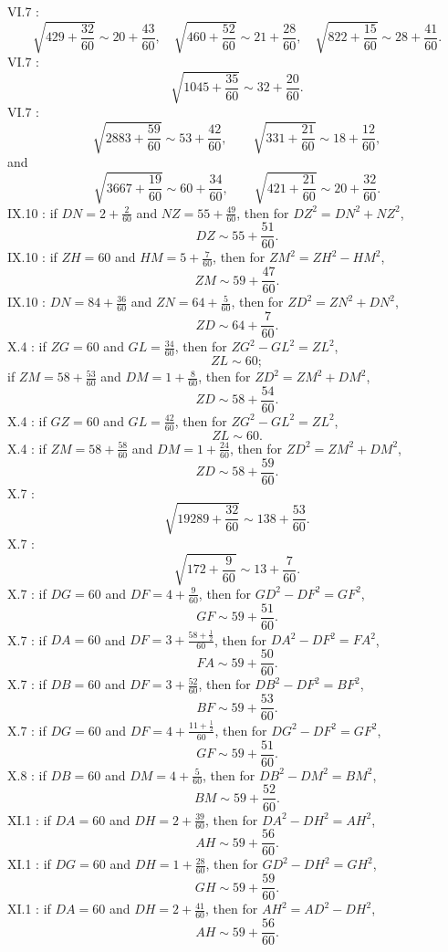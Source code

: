 \documentclass{article}
\theoremstyle{definition}
\begin{document}
VI.7 \cite[p.~299]{almagest}:
\[
\sqrt{429+\frac{32}{60}} \sim 20+\frac{43}{60},\quad
\sqrt{460+\frac{52}{60}} \sim 21+\frac{28}{60},
\quad 
\sqrt{822+\frac{15}{60}} \sim 28+\frac{41}{60}.
\]
VI.7 \cite[p.~300]{almagest}:
\[
\sqrt{1045+\frac{35}{60}} \sim 32+\frac{20}{60}.
\]
VI.7 \cite[p.~301]{almagest}:
\[
\sqrt{2883+\frac{59}{60}} \sim 53+\frac{42}{60},
\qquad \sqrt{331+\frac{21}{60}} \sim 18+\frac{12}{60},
\]
and
\[
\sqrt{3667+\frac{19}{60}} \sim 60+\frac{34}{60},
\qquad \sqrt{421+\frac{21}{60}} \sim 20+\frac{32}{60}.
\]
IX.10 \cite[p.~463]{almagest}: if $DN=2+\frac{2}{60}$ and $NZ=55+\frac{49}{60}$, then for
$DZ^2=DN^2+NZ^2$,
\[
DZ \sim 55 + \frac{51}{60}.
\]
IX.10 \cite[pp.~465--466]{almagest}: if $ZH=60$ and $HM=5+\frac{7}{60}$, then for $ZM^2=ZH^2-HM^2$,
\[
ZM \sim 59+\frac{47}{60}.
\]
IX.10 \cite[p.~466]{almagest}: $DN=84+\frac{36}{60}$ and $ZN=64+\frac{5}{60}$, then for $ZD^2=ZN^2+DN^2$,
\[
ZD \sim 64+\frac{7}{60}.
\]
X.4 \cite[p.~476]{almagest}: if $ZG=60$ and $GL=\frac{34}{60}$, then for $ZG^2-GL^2=ZL^2$,
\[
ZL \sim 60;
\]
if $ZM=58+\frac{53}{60}$ and $DM=1+\frac{8}{60}$, then for $ZD^2=ZM^2+DM^2$,
\[
ZD \sim 58 + \frac{54}{60}.
\]
X.4 \cite[pp.~477--478]{almagest}: if $GZ=60$ and $GL=\frac{42}{60}$, then for $ZG^2-GL^2=ZL^2$,
\[
ZL \sim 60.
\]
X.4 \cite[p.~478]{almagest}: if $ZM = 58+\frac{58}{60}$ and $DM=1+\frac{24}{60}$, then for $ZD^2=ZM^2+DM^2$,
\[
ZD \sim 58+\frac{59}{60}.
\]
X.7 \cite[p.~488]{almagest}:
\[
\sqrt{19289+\frac{32}{60}} \sim 138+\frac{53}{60}.
\]
X.7 \cite[p.~489]{almagest}:
\[
\sqrt{172+\frac{9}{60}} \sim 13+\frac{7}{60}.
\]
X.7 \cite[p.~493]{almagest}: if $DG=60$ and $DF=4+\frac{9}{60}$, then for $GD^2-DF^2=GF^2$,
\[
GF \sim 59+\frac{51}{60}.
\]
X.7 \cite[p.~495]{almagest}: if $DA=60$ and $DF=3+\frac{58+\frac{1}{2}}{60}$,
then for $DA^2-DF^2=FA^2$,
\[
FA \sim 59 + \frac{50}{60}.
\]
X.7 \cite[p.~496]{almagest}: if $DB=60$ and $DF=3+\frac{52}{60}$, then for
$DB^2-DF^2=BF^2$,
\[
BF \sim 59+\frac{53}{60}.
\]
X.7 \cite[p.~498]{almagest}: if $DG=60$ and $DF=4+\frac{11+\frac{1}{2}}{60}$, then for $DG^2-DF^2=GF^2$,
\[
GF \sim 59+\frac{51}{60}.
\]
X.8 \cite[p.~501]{almagest}: if $DB=60$ and $DM=4+\frac{5}{60}$, then for $DB^2-DM^2=BM^2$,
\[
BM \sim 59+\frac{52}{60}.
\]
XI.1 \cite[p.~512]{almagest}: if $DA=60$ and $DH=2+\frac{39}{60}$, then for $DA^2-DH^2=AH^2$,
\[
AH \sim 59+\frac{56}{60}.
\]
XI.1 \cite[p.~514]{almagest}: if $DG=60$ and $DH=1+\frac{28}{60}$, then for
$GD^2-DH^2=GH^2$,
\[
GH \sim 59+\frac{59}{60}.
\]
XI.1 \cite[p.~516]{almagest}: if $DA=60$ and $DH=2+\frac{41}{60}$, then for $AH^2=AD^2-DH^2$,
\[
AH \sim 59+\frac{56}{60}.
\]
\end{document}

